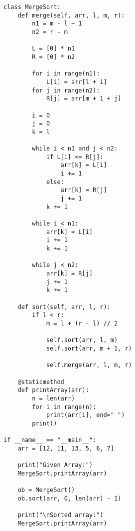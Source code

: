 \documentclass{article}
\begin{document}
\begin{verbatim}
class MergeSort:
    def merge(self, arr, l, m, r):
        n1 = m - l + 1
        n2 = r - m

        L = [0] * n1
        R = [0] * n2

        for i in range(n1):
            L[i] = arr[l + i]
        for j in range(n2):
            R[j] = arr[m + 1 + j]

        i = 0
        j = 0
        k = l

        while i < n1 and j < n2:
            if L[i] <= R[j]:
                arr[k] = L[i]
                i += 1
            else:
                arr[k] = R[j]
                j += 1
            k += 1

        while i < n1:
            arr[k] = L[i]
            i += 1
            k += 1

        while j < n2:
            arr[k] = R[j]
            j += 1
            k += 1

    def sort(self, arr, l, r):
        if l < r:
            m = l + (r - l) // 2

            self.sort(arr, l, m)
            self.sort(arr, m + 1, r)

            self.merge(arr, l, m, r)

    @staticmethod
    def printArray(arr):
        n = len(arr)
        for i in range(n):
            print(arr[i], end=" ")
        print()

if __name__ == "__main__":
    arr = [12, 11, 13, 5, 6, 7]

    print("Given Array:")
    MergeSort.printArray(arr)

    ob = MergeSort()
    ob.sort(arr, 0, len(arr) - 1)

    print("\nSorted array:")
    MergeSort.printArray(arr)
\end{verbatim}
\end{document}
